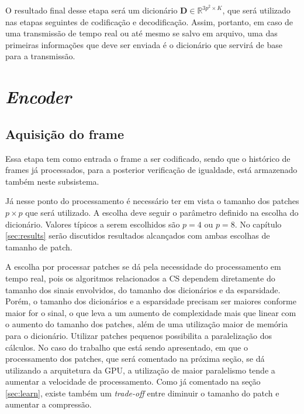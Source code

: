 \documentclass[cic,tc]{iiufrgs}
\newcommand{\mat}[1]{\bm{#1}}
\begin{document}
O resultado final desse etapa será um dicionário $\mat{D} \in \mathbb{R}^{3p^2 \times K}$,
que será utilizado nas etapas seguintes de codificação e decodificação.
Assim, portanto, em caso de uma transmissão de tempo real ou até mesmo se salvo em arquivo,
uma das primeiras informações que deve ser enviada é o dicionário que servirá de base
para a transmissão.


\section{\textit{Encoder}}
\subsection{Aquisição do frame}
\label{sec:frameaquisition}
Essa etapa tem como entrada o frame a ser codificado, sendo que o histórico de frames já
processados, para a posterior verificação de igualdade, está armazenado também neste
subsistema.

Já nesse ponto do processamento é necessário ter em vista o tamanho dos patches $p\times p$
que será utilizado. A escolha deve seguir o parâmetro definido na escolha do dicionário.
Valores típicos a serem escolhidos são $p=4$ ou $p=8$. No capítulo \autoref{sec:results} serão 
discutidos resultados alcançados com ambas escolhas de tamanho de patch.

A escolha por processar patches se dá pela necessidade do processamento em tempo real, pois 
os algoritmos relacionados a CS dependem diretamente do tamanho
dos sinais envolvidos, do tamanho dos dicionários e da esparsidade.
Porém, o tamanho dos dicionários e a esparsidade precisam ser maiores conforme maior for 
o sinal, o que leva a um aumento de complexidade mais que linear com o aumento do tamanho dos
patches, além de uma utilização maior de memória para o dicionário.
Utilizar patches pequenos possibilita a paralelização dos cálculos.
No caso do trabalho que está sendo apresentado, em que o processamento dos patches, que será 
comentado na próxima seção, se dá utilizando a arquitetura da GPU, a utilização de maior 
paralelismo tende a aumentar a velocidade de processamento.
Como já comentado na seção \autoref{sec:learn}, existe também um \textit{trade-off} entre 
diminuir o tamanho do patch e aumentar a compressão.
\end{document}
